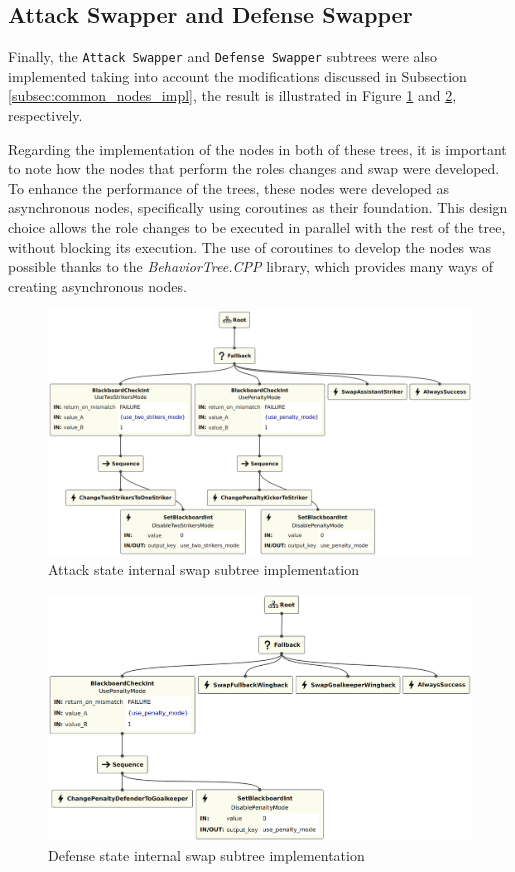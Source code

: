 \subsection{Attack Swapper and Defense Swapper}

Finally, the \texttt{Attack Swapper} and \texttt{Defense Swapper} subtrees were also implemented taking into account the modifications discussed in Subsection \ref{subsec:common_nodes_impl}, the result is illustrated in Figure \ref{fig:attack_swapper_impl} and \ref{fig:defense_swapper_impl}, respectively.

Regarding the implementation of the nodes in both of these trees, it is important to note how the nodes that perform the roles changes and swap were developed. To enhance the performance of the trees, these nodes were developed as asynchronous nodes, specifically using coroutines as their foundation. This design choice allows the role changes to be executed in parallel with the rest of the tree, without blocking its execution. The use of coroutines to develop the nodes was possible thanks to the \textit{BehaviorTree.CPP} library, which provides many ways of creating asynchronous nodes.

\begin{figure}[!h]
    \centering
    \includegraphics[width=1.0\linewidth]{chapters/development/images/AttackSwapper.png}
    \caption{Attack state internal swap subtree implementation}
    \label{fig:attack_swapper_impl}
\end{figure}

\begin{figure}[!h]
    \centering
    \includegraphics[width=1.0\linewidth]{chapters/development/images/DefenseSwapper.png}
    \caption{Defense state internal swap subtree implementation}
    \label{fig:defense_swapper_impl}
\end{figure}
